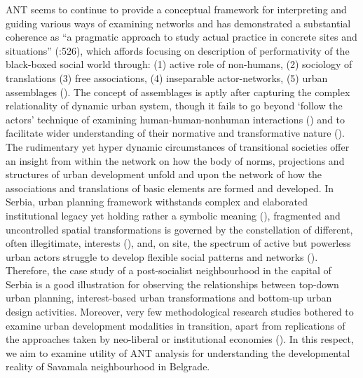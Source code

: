 \documentclass[11pt]{report}
\begin{document}
ANT seems to continue to provide a conceptual framework for interpreting and guiding various ways of examining networks and has demonstrated a substantial coherence as “a pragmatic approach to study actual practice in concrete sites and situations” (\href{Farías}{\citealt{farias_culture_2015}}:526), which affords focusing on description of performativity of the black-boxed social world through: (1) active role of non-humans, (2) sociology of translations (3) free associations, (4) inseparable actor-networks, (5) urban assemblages (\href{Latour}{\citealt{latour_actor-network_1996}}). The concept of assemblages is aptly after capturing the complex relationality of dynamic urban system, though it fails to go beyond ‘follow the actors’ technique of examining human-human-nonhuman interactions (\href{Cowan}{\citealt{cowan_nominations:_2009}}) and to facilitate wider understanding of their normative and transformative nature (\href{Gabriel}{\citealt{gabriel_post-social_2008}}).
\\

The rudimentary yet hyper dynamic circumstances of transitional societies offer an insight from within the network on how the body of norms, projections and structures of urban development unfold and upon the network of how the associations and translations of basic elements are formed and developed. In Serbia, urban planning framework withstands complex and elaborated institutional legacy yet holding rather a symbolic meaning (\href{Nedovic}{\citealt{nedovic-budic_adjustment_2001}}), fragmented and uncontrolled spatial transformations is governed by the constellation of different, often illegitimate, interests (\href{Petrovic}{\citealt{petrovic_cities_2009}}), and, on site, the spectrum of active but powerless urban actors struggle to develop flexible social patterns and networks (\href{Cvetinovic}{\citealt{cvetinovic_engine_2013}}). Therefore, the case study of a post-socialist neighbourhood in the capital of Serbia is a good illustration for observing the relationships between top-down urban planning, interest-based urban transformations and bottom-up urban design activities. Moreover, very few methodological research studies bothered to examine urban  development modalities  in  transition,  apart  from  replications  of  the  approaches  taken  by  neo-liberal  or institutional economies (\href{Tsenkova}{\citealt{tsenkova_urban_2007}}). In this respect, we aim to examine utility of ANT analysis for understanding the developmental reality of Savamala neighbourhood in Belgrade.
\end{document}
